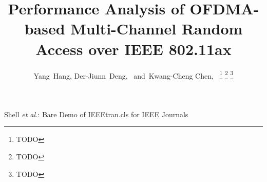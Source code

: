 \documentclass[journal]{IEEEtran}
\begin{document}
%
\title{Performance Analysis of OFDMA-based Multi-Channel Random Access over IEEE 802.11ax}
%
%
%

\author{Yang~Hang,
        Der-Jiunn~Deng,~ 
        and~Kwang-Cheng Chen,~%
\thanks{TODO}%
\thanks{TODO}%
\thanks{TODO}}

% 
%



%
{Shell \MakeLowercase{\textit{et al.}}: Bare Demo of IEEEtran.cls for IEEE Journals}
% 
\end{document}
